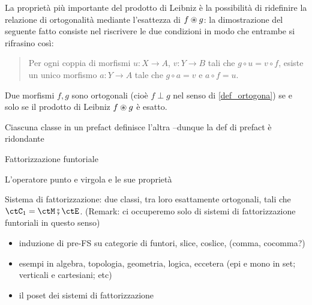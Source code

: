 La proprietà più importante del prodotto di Leibniz è la possibilità di ridefinire la relazione di ortogonalità mediante l'esattezza di $f\oast g$: la dimostrazione del seguente fatto consiste nel riscrivere le due condizioni in modo che entrambe si rifrasino così: 
\begin{quote}
  Per ogni coppia di morfismi $u : X\to A$, $v : Y\to B$ tali che $g\circ u=v\circ f$, esiste un unico morfismo $a : Y\to A$ tale che $g\circ a=v$ e $a\circ f=u$.
\end{quote}
\begin{proposition}
  Due morfismi $f,g$ sono ortogonali (cioè $f\perp g$ nel senso di \ref{def_ortogona}) se e solo se il prodotto di Leibniz $f\oast g$ è esatto. 
\end{proposition}
\begin{definition}
\Todo{}
\end{definition}
\begin{proposition}
  Ciascuna classe in un prefact definisce l'altra --dunque la def di prefact è ridondante 
\end{proposition}
\begin{definition}
  Fattorizzazione funtoriale 
\end{definition}
\begin{definition}
L'operatore punto e virgola e le sue proprietà
\end{definition}
\begin{definition}
Sistema di fattorizzazione: due classi, tra loro esattamente ortogonali, tali che $\ctC_1 = \ctM \fatsemi \ctE$.
(Remark: ci occuperemo solo di sistemi di fattorizzazione funtoriali in questo senso)
\end{definition}
\begin{itemize}
	\item induzione di pre-FS su categorie di funtori, slice, coslice, (comma, cocomma?)
	\item esempi in algebra, topologia, geometria, logica, eccetera (epi e mono in set; verticali e cartesiani; etc)
	\item il poset dei sistemi di fattorizzazione
\end{itemize}
